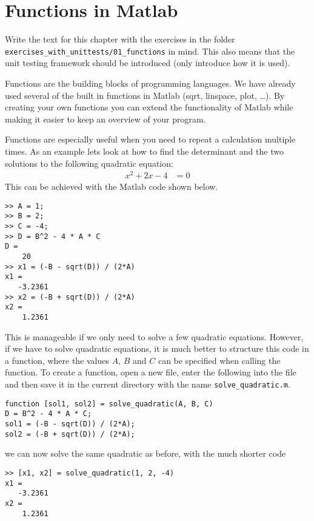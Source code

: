 \section{Functions in Matlab}


Write the text for this chapter with the exercises in the folder
\verb!exercises_with_unittests/01_functions! in mind.
This also means that the unit testing framework should be introduced (only introduce how it is used).

Functions are the building blocks of programming languages.
We have already used several of the built in functions 
in Matlab (sqrt, linspace, plot, \ldots). 
By creating your own functions you can extend the functionality of 
Matlab while making it easier to keep an overview of your program.

Functions are especially useful when you need to repeat a calculation 
multiple times.
As an example lets look at how to find the determinant and the two solutions 
to the following quadratic equation: 
\begin{align*}
x^2 + 2x - 4 &= 0 
\end{align*}
This can be achieved with the Matlab code shown below.
\begin{lstlisting}
>> A = 1; 
>> B = 2; 
>> C = -4;
>> D = B^2 - 4 * A * C
D =
    20
>> x1 = (-B - sqrt(D)) / (2*A)
x1 =
   -3.2361
>> x2 = (-B + sqrt(D)) / (2*A)
x2 =
    1.2361
\end{lstlisting}
This is manageable if we only need to solve a few quadratic equations.
However, if we have to solve quadratic equations, it is much better to 
structure this code in a function, where the values $A$, $B$ and $C$ can be 
specified when calling the function.
To create a function, open a new file, enter the following into the file 
and then save it in the current directory with the name 
\verb!solve_quadratic.m!.
\begin{lstlisting}
function [sol1, sol2] = solve_quadratic(A, B, C)
D = B^2 - 4 * A * C;
sol1 = (-B - sqrt(D)) / (2*A);
sol2 = (-B + sqrt(D)) / (2*A);
\end{lstlisting}
we can now solve the same quadratic as before, with the much shorter code
\begin{lstlisting}
>> [x1, x2] = solve_quadratic(1, 2, -4)
x1 =
   -3.2361
x2 =
    1.2361
\end{lstlisting}






